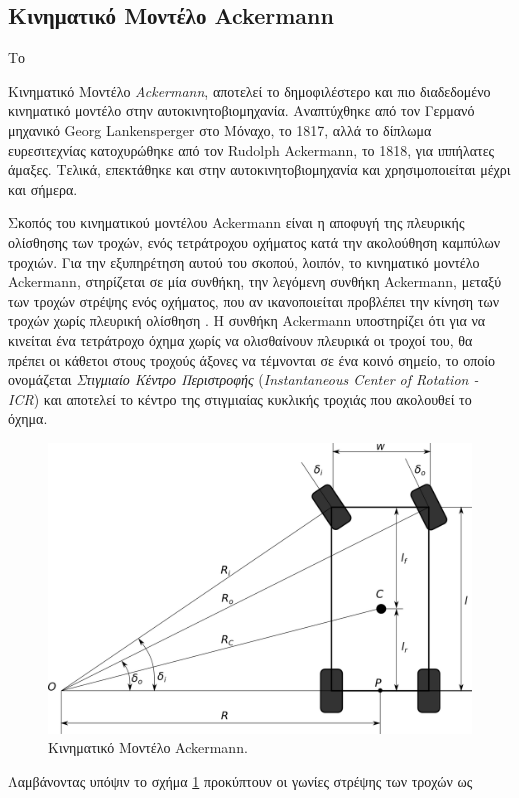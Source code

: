 \subsection{Κινηματικό Μοντέλο Ackermann} \label{ssec:ackermann_kinematics}
Το {Κινηματικό Μοντέλο \textit{Ackermann}, αποτελεί το δημοφιλέστερο και πιο διαδεδομένο κινηματικό μοντέλο στην αυτοκινητοβιομηχανία. Αναπτύχθηκε από τον Γερμανό μηχανικό Georg Lankensperger στο Μόναχο, το 1817, αλλά το δίπλωμα ευρεσιτεχνίας κατοχυρώθηκε από τον Rudolph Ackermann, το 1818, για ιππήλατες άμαξες. Τελικά, επεκτάθηκε και στην αυτοκινητοβιομηχανία και χρησιμοποιείται μέχρι και σήμερα.

\bigskip 
Σκοπός του κινηματικού μοντέλου {Ackermann} είναι η αποφυγή της πλευρικής ολίσθησης των τροχών, ενός τετράτροχου οχήματος κατά την ακολούθηση καμπύλων τροχιών. Για την εξυπηρέτηση αυτού του σκοπού, λοιπόν, το {κινηματικό μοντέλο Ackermann}, στηρίζεται σε μία συνθήκη, την λεγόμενη {συνθήκη Ackermann}, μεταξύ των τροχών στρέψης ενός οχήματος, που αν ικανοποιείται προβλέπει την κίνηση των τροχών χωρίς πλευρική ολίσθηση \cite{vehicle_dynamics}. Η συνθήκη Ackermann υποστηρίζει ότι για να κινείται ένα τετράτροχο όχημα χωρίς να ολισθαίνουν πλευρικά οι τροχοί του, θα πρέπει οι κάθετοι στους τροχούς άξονες να τέμνονται σε ένα κοινό σημείο, το οποίο ονομάζεται \textit{Στιγμιαίο Κέντρο Περιστροφής} (\textit{Instantaneous Center of Rotation - ICR}) \cite{4ws_kinematics} και αποτελεί το κέντρο της στιγμιαίας κυκλικής τροχιάς που ακολουθεί το όχημα.

\begin{figure}[!ht]
	\centering
	\includegraphics[width=0.7\linewidth]{Chapters/Chapter2/Figures/ackermann_model.png}
	\caption{Κινηματικό Μοντέλο Ackermann.}
	\label{fig:ackermann_model}
\end{figure}

\bigskip
Λαμβάνοντας υπόψιν το σχήμα \ref{fig:ackermann_model} προκύπτουν οι γωνίες στρέψης των τροχών ως

}
